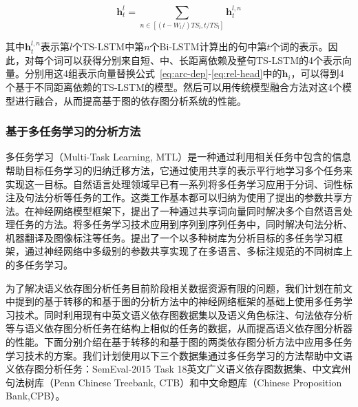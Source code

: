 \begin{equation}
\mathbf{h}^l_t = \sum_{n \in [(t-W_l/)TS_l,t/TS_l]}\mathbf{h}^{l,n}_t
\end{equation}

其中$\mathbf{h}^{l,n}_t$表示第$l$个TS-LSTM中第$n$个Bi-LSTM计算出的句中第$t$个词的表示。因此，对每个词可以获得分别来自短、中、长距离依赖及整句TS-LSTM的4个表示向量。分别用这4组表示向量替换公式~\ref{eq:arc-dep}-\ref{eq:rel-head}中的$\mathbf{h}_i$，可以得到4个基于不同距离依赖的TS-LSTM的模型。然后可以用传统模型融合方法对这4个模型进行融合，从而提高基于图的依存图分析系统的性能。

\subsubsection{基于多任务学习的分析方法}

多任务学习（Multi-Task Learning, MTL）是一种通过利用相关任务中包含的信息帮助目标任务学习的归纳迁移方法，它通过使用共享的表示平行地学习多个任务来实现这一目标。自然语言处理领域早已有一系列将多任务学习应用于分词、词性标注及句法分析等任务的工作。这类工作基本都可以归纳为使用了提出的参数共享方法。在神经网络模型框架下，提出了一种通过共享词向量同时解决多个自然语言处理任务的方法。将多任务学习技术应用到序列到序列任务中，同时解决句法分析、机器翻译及图像标注等任务。提出了一个以多种树库为分析目标的多任务学习框架，通过神经网络中多级别的参数共享实现了在多语言、多标注规范的不同树库上的多任务学习。

为了解决语义依存图分析任务目前阶段相关数据资源有限的问题，我们计划在前文中提到的基于转移的和基于图的分析方法中的神经网络框架的基础上使用多任务学习技术。同时利用现有中英文语义依存图数据集以及语义角色标注、句法依存分析等与语义依存图分析任务在结构上相似的任务的数据，从而提高语义依存图分析器的性能。下面分别介绍在基于转移的和基于图的两类依存图分析方法中应用多任务学习技术的方案。我们计划使用以下三个数据集通过多任务学习的方法帮助中文语义依存图分析任务：SemEval-2015 Task 18英文广义语义依存图数据集、中文宾州句法树库（Penn Chinese Treebank, CTB）和中文命题库（Chinese Proposition Bank,CPB）。

